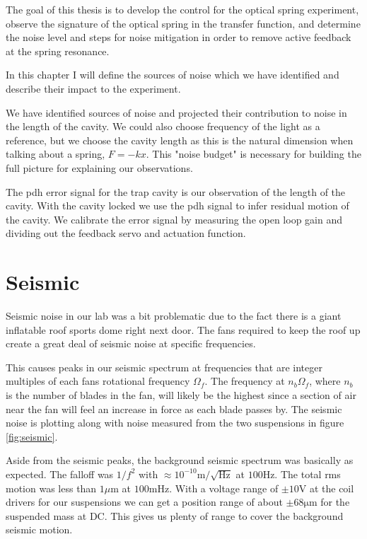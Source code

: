 \acresetall

The goal of this thesis is to develop the control for the optical spring
experiment, observe the signature of the optical spring in the transfer
function, and determine the noise level and steps for noise mitigation
in order to remove active feedback at the spring resonance.

In this chapter I will define the sources of noise which we have identified
and describe their impact to the experiment.

We have identified sources of noise and projected their contribution to noise
in the length of the cavity.
We could also choose frequency of the light as a reference, but we choose the
cavity length as this is the natural dimension when talking about a spring,
$F=-kx$.
This "noise budget" is necessary for building the full picture for explaining our
observations.

The \ac{pdh} error signal for the trap cavity is our observation of the length
of the cavity.
With the cavity locked we use the \ac{pdh} signal to infer residual motion of
the cavity.
We calibrate the error signal by measuring the open loop gain and dividing out
the feedback servo and actuation function.

\section{Seismic}
\label{sec:seismic}

Seismic noise in our lab was a bit problematic due to the fact there is a giant
inflatable roof sports dome right next door. The fans required to keep the roof
up create a great deal of seismic noise at specific frequencies.

This causes peaks in our seismic spectrum at frequencies that are integer
multiples of each fans rotational frequency $\Omega_f$.
The frequency at $n_b\Omega_f$, where $n_b$ is the number of blades in the fan,
will likely be the highest since a section of air near the fan will feel an
increase in force as each blade passes by. The seismic noise is plotting along
with noise measured from the two suspensions in figure \ref{fig:seismic}.

Aside from the seismic peaks, the background seismic spectrum was basically as
expected.
The falloff was $1/f^2$ with $\approx 10^{-10} \mathrm{m/\sqrt{Hz}}$ at
$\mathrm{100 Hz}$.
The total rms motion was less than $1\mu \mathrm{m}$ at $\mathrm{100 mHz}$.
With a voltage range of $\pm 10 \mathrm{V}$ at the coil drivers for our
suspensions we can get a position range of about $\pm 68\mathrm{\mu m}$ for
the suspended mass at DC.
This gives us plenty of range to cover the background seismic motion.

